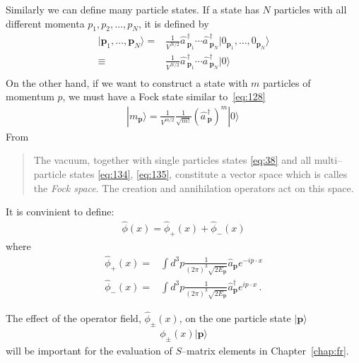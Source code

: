 Similarly we can define many particle states. If a state has $N$ particles with all different momenta $p_1,p_2,\ldots,p_N$, it is defined by
\begin{align}
  \label{eq:134}
  |\mathbf{p}_1,\ldots,\mathbf{p}_N\rangle=&\frac{1}{V^{N/2}}\widehat{a\,}_{\mathbf{p}_1}^\dagger\cdots
\widehat{a\,}_{\mathbf{p}_N}^\dagger|0_{\mathbf{p}_1},\ldots,0_{\mathbf{p}_N}\rangle\nonumber\\
\equiv&\frac{1}{V^{N/2}}\widehat{a\,}_{\mathbf{p}_1}^\dagger\cdots
\widehat{a\,}_{\mathbf{p}_N}^\dagger|0\rangle\nonumber\\
\end{align}
On the other hand, if we want to construct a state with $m$ particles of momentum $p$, we must have a Fock state similar to~\eqref{eq:128}
\begin{align}
\label{eq:135}
  |m_{\mathbf{p}}\rangle=\frac{1}{V^{m/2}}\frac{1}{\sqrt{m!}}\left(\widehat{a\,}_{\mathbf{p}}^\dagger\right)^{m}|0\rangle\,
\end{align}
From\cite{Lahiri:2005sm}
\begin{quote}
  The vacuum, together with single particles states \eqref{eq:38} and all multi--particle states \eqref{eq:134}, \eqref{eq:135}, constitute a vector space which is calles the \emph{Fock space}. The creation and annihilation operators act on this space.
\end{quote}



It is convinient to define: 
\begin{align}
\label{eq:36}
  \widehat{\phi}(x)=\widehat{\phi}_+(x)+\widehat{\phi}_-(x)
\end{align}
where
\begin{align}
\label{eq:37}
  \widehat{\phi}_+(x)=&\int d^3p \frac{1}{(2\pi)^3\sqrt{2E_\mathbf{p} }}
  \widehat{a}_\mathbf{p} e^{-i p\cdot x }\nonumber\\
  \widehat{\phi}_-(x)=&\int d^3p \frac{1}{(2\pi)^3\sqrt{2E_\mathbf{p} }}\widehat{a}_\mathbf{p}^\dagger e^{i p\cdot x }\,.
\end{align}

The effect of the operator field, $\widehat{\phi}_\pm(x)$, on the one particle state $|\mathbf{p}\rangle$
\begin{align}
  \phi_\pm(x)|\mathbf{p}\rangle
\end{align}
will be important for the evaluation of $S$--matrix elements in Chapter~\ref{chap:fr}.

